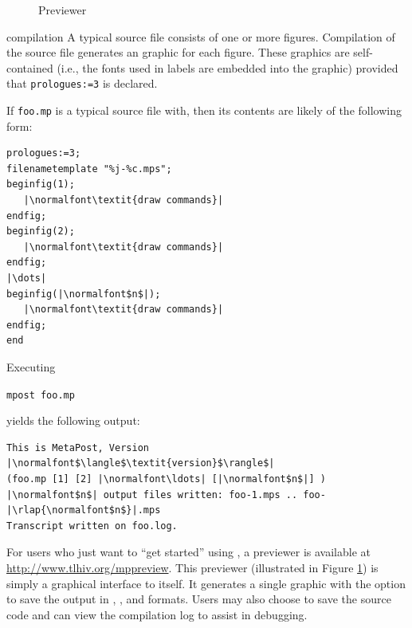 \begin{figure}
	\begin{center}
		\caption{\MP{} Previewer}\label{fig:previewer}
	\end{center}
\end{figure}

\begin{section}{\MP{} compilation}
A typical \MP{} source file consists of one or more figures.  Compilation of the source file generates an \EPS{} graphic for each figure.  These \EPS{} graphics are self-contained (i.e., the fonts used in labels are embedded into the graphic) provided that \lstinline{prologues:=3} is declared.

If \texttt{foo.mp} is a typical \MP{} source file with, then its contents are likely of the following form:
\begin{lstlisting}[xleftmargin=1.25\parindent]
prologues:=3;
filenametemplate "%j-%c.mps";
beginfig(1);
   |\normalfont\textit{draw commands}|
endfig;
beginfig(2);
   |\normalfont\textit{draw commands}|
endfig;
|\dots|
beginfig(|\normalfont$n$|);
   |\normalfont\textit{draw commands}|
endfig;
end
\end{lstlisting}
Executing \begin{flushleft}\hspace*{1.25\parindent}\texttt{mpost foo.mp}\end{flushleft} yields the following output:
\begin{lstlisting}[xleftmargin=1.25\parindent]
This is MetaPost, Version |\normalfont$\langle$\textit{version}$\rangle$|
(foo.mp [1] [2] |\normalfont\ldots| [|\normalfont$n$|] )
|\normalfont$n$| output files written: foo-1.mps .. foo-|\rlap{\normalfont$n$}|.mps
Transcript written on foo.log.
\end{lstlisting}

For users who just want to ``get started'' using \MP{}, a \MP{} previewer is available at \url{http://www.tlhiv.org/mppreview}.  This previewer (illustrated in Figure \ref{fig:previewer}) is simply a graphical interface to \MP{} itself.
It generates a single graphic with the option to save the output in \EPS{}, \PDF{}, and \SVG{} formats.  Users may also choose to save the source code and can view the compilation log to assist in debugging.
\end{section}
